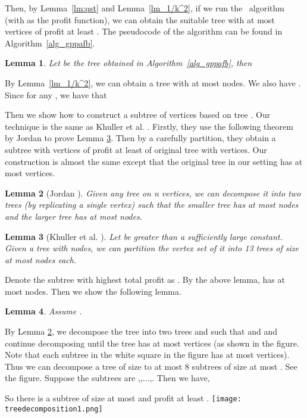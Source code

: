 \documentclass[11pt]{article}
\newcommand{\rednote}[1]{#1}
\newcommand{\qst}{}
\newenvironment{proof}{\noindent {\em Proof: }\ignorespaces}{}
\newcommand{\qed}{\hspace*{\fill}\medskip}
\newtheorem{lemma}{Lemma}
\begin{document}
Then, by Lemma~\ref{lm:qst} and Lemma~\ref{lm_1/k^2},
if we run the \qst\ algorithm (with  as the profit function),
we can obtain the suitable tree  with at most  vertices of profit at least .
The pseudocode of the algorithm can be found in Algorithm~\ref{alg_gppafb}.


\begin{lemma}
	Let  be the tree obtained in Algorithm~\ref{alg_gppafb}, then
	
	\label{lm_treeAppro}
\end{lemma}
\begin{proof}
	By Lemma~\ref{lm_1/k^2}, we can obtain a tree  with at most  nodes. We also have .
	Since  for any , we have that
	
	\qed
\end{proof}



Then we show how to construct a subtree  of  vertices based on tree . Our technique is the same as Khuller et al. \cite{khuller2014analyzing}.
Firstly, they use the following theorem by Jordan \cite{jordan1869assemblages} to prove Lemma \ref{lm_khuller}. Then by a carefully partition, they obtain a subtree with  vertices of profit at least  of original tree with  vertices. Our construction is almost the same except that the original tree  in our setting has at most  vertices.

\begin{lemma}[Jordan \cite{jordan1869assemblages}]
	Given any tree on n vertices, we can decompose it into two trees (by replicating a single vertex) such that the smaller tree has at most  nodes and the larger tree has at most  nodes.
	\label{lm_jordan}
\end{lemma}
\begin{lemma}[Khuller et al. \cite{khuller2014analyzing}]
	Let  be greater than a sufficiently large constant. Given a tree  with  nodes, we can \rednote{partition the vertex set of } it into 13 trees of size at most  nodes each.
	\label{lm_khuller}
\end{lemma}

Denote the subtree with highest total profit as . 
By the above lemma,  has at most  nodes.
Then we show the following lemma.
\begin{lemma}
	Assume . 
	\label{th_treeDecompose}
\end{lemma}
\begin{proof} By Lemma \ref{lm_jordan}, we decompose the tree  into two trees  and  such that  and  and continue decomposing until the tree has at most  vertices (as shown in the figure. Note that each subtree in the white square in the figure has at most  vertices).
	Thus we can decompose a tree of size  to at most 8 subtrees of size at most .
	See the figure.
	Suppose the subtrees are ,,...,. Then we have,
	
	So there is a subtree of size at most  and profit at least .
	\qed
\end{proof}
\texttt{[image: treedecomposition1.png]}
\end{document}
